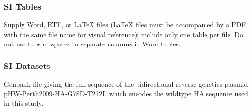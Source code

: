 \documentclass[9pt,twocolumn,twoside]{pnas-new}
\begin{document}
\subsubsection*{SI Tables}

Supply Word, RTF, or LaTeX files (LaTeX files must be accompanied by a PDF with the same file name for visual reference); include only one table per file. Do not use tabs or spaces to separate columns in Word tables.

\subsubsection*{SI Datasets} 

\begin{suppdata}
\caption{\label{suppdata:PerthHA}
Genbank file giving the full sequence of the bidirectional reverse-genetics plasmid pHW-Perth2009-HA-G78D-T212I, which encodes the wildtype HA sequence used in this study.
}
\end{suppdata}
\end{document}
